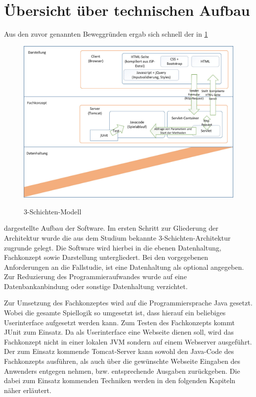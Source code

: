 \section{Übersicht über technischen Aufbau}
Aus den zuvor genannten Beweggründen ergab sich schnell der in \ref{fig:abb} 
\begin{figure}[!h]
	\centering
	\includegraphics[scale=0.2]{img/3-schichten-modell.jpeg}
	\label{fig:abb} 
	\caption{3-Schichten-Modell} 
\end{figure}
dargestellte Aufbau der Software. Im ersten Schritt zur Gliederung der Architektur wurde die aus dem Studium bekannte 3-Schichten-Architektur zugrunde gelegt. Die Software wird hierbei in die ebenen Datenhaltung, Fachkonzept sowie Darstellung untergliedert. Bei den vorgegebenen Anforderungen an die Fallstudie, ist eine Datenhaltung als optional angegeben. Zur Reduzierung des Programmieraufwandes wurde auf eine Datenbankanbindung oder sonstige Datenhaltung verzichtet.

Zur Umsetzung des Fachkonzeptes wird auf die Programmiersprache Java gesetzt. Wobei die gesamte Spiellogik so umgesetzt ist, dass hierauf ein beliebiges Userinterface aufgesetzt werden kann. Zum Testen des Fachkonzepts kommt JUnit zum Einsatz. Da als Userinterface eine Webseite dienen soll, wird das Fachkonzept nicht in einer lokalen JVM sondern auf einem Webserver ausgeführt. Der zum Einsatz kommende Tomcat-Server kann sowohl den Java-Code des Fachkonzepts ausführen, als auch über die gewünschte Webseite Eingaben des Anwenders entgegen nehmen, bzw. entsprechende Ausgaben zurückgeben. Die dabei zum Einsatz kommenden Techniken werden in den folgenden Kapiteln näher erläutert.

